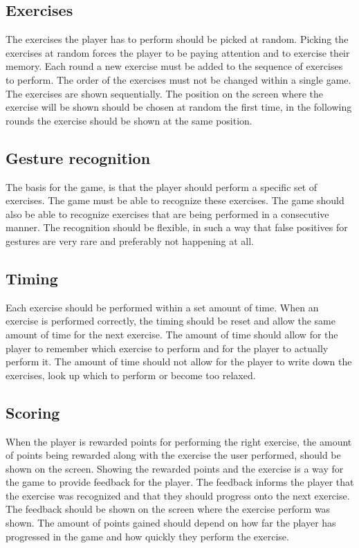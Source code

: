 \documentclass[11pt]{report}
\begin{document}
\subsection{Exercises}
The exercises the player has to perform should be picked at random. Picking the exercises at random forces the player to be paying attention and to exercise their memory. Each round a new exercise must be added to the sequence of exercises to perform. The order of the exercises must not be changed within a single game. The exercises are shown sequentially. The position on the screen where the exercise will be shown should be chosen at random the first time, in the following rounds the exercise should be shown at the same position.

\subsection{Gesture recognition}
The basis for the game, is that the player should perform a specific set of exercises. The game must be able to recognize these exercises. The game should also be able to recognize exercises that are being performed in a consecutive manner. The recognition should be flexible, in such a way that false positives for gestures are very rare and preferably not happening at all.

\subsection{Timing}
Each exercise should be performed within a set amount of time. When an exercise is performed correctly, the timing should be reset and allow the same amount of time for the next exercise. The amount of time should allow for the player to remember which exercise to perform and for the player to actually perform it. The amount of time should not allow for the player to write down the exercises, look up which to perform or become too relaxed.

\subsection{Scoring}
When the player is rewarded points for performing the right exercise, the amount of points being rewarded along with the exercise the user performed, should be shown on the screen. Showing the rewarded points and the exercise is a way for the game to provide feedback for the player. The feedback informs the player that the exercise was recognized and that they should progress onto the next exercise. The feedback should be shown on the screen where the exercise perform was shown. The amount of points gained should depend on how far the player has progressed in the game and how quickly they perform the exercise.
\end{document}
